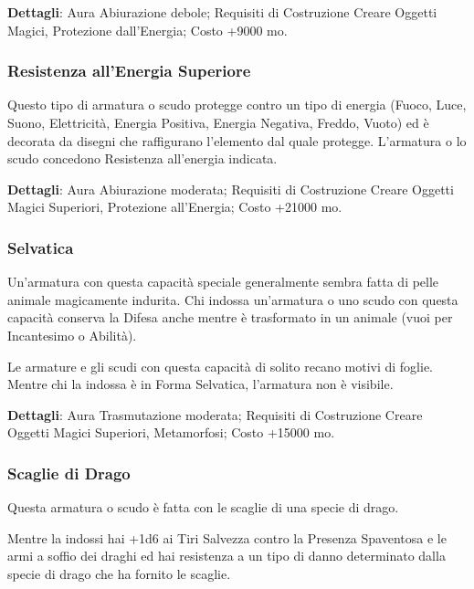\begin{multicols}{2}
\textbf{Dettagli}: Aura Abiurazione debole; Requisiti di Costruzione Creare Oggetti Magici, Protezione dall'Energia; Costo +9000 mo.

\subsubsection*{Resistenza all'Energia Superiore}

Questo tipo di armatura o scudo protegge contro un tipo di energia (Fuoco, Luce, Suono, Elettricità, Energia Positiva, Energia Negativa, Freddo, Vuoto) ed è decorata da disegni che raffigurano l'elemento dal quale protegge. L'armatura o lo scudo concedono Resistenza all'energia indicata.

\textbf{Dettagli}: Aura Abiurazione moderata; Requisiti di Costruzione Creare Oggetti Magici Superiori, Protezione all'Energia; Costo +21000 mo.

\subsubsection*{Selvatica}

Un'armatura con questa capacità speciale generalmente sembra fatta di pelle animale magicamente indurita. Chi indossa un'armatura o uno scudo con questa capacità conserva la Difesa anche mentre è trasformato in un animale (vuoi per Incantesimo o Abilità).

Le armature e gli scudi con questa capacità di solito recano motivi di foglie. Mentre chi la indossa è in Forma Selvatica, l'armatura non è visibile.

\textbf{Dettagli}: Aura Trasmutazione moderata; Requisiti di Costruzione Creare Oggetti Magici Superiori, Metamorfosi; Costo +15000 mo.

\subsubsection*{Scaglie di Drago}

Questa armatura o scudo è fatta con le scaglie di una specie di drago.

Mentre la indossi hai +1d6 ai Tiri Salvezza contro la Presenza Spaventosa e le armi a soffio dei draghi ed hai resistenza a un tipo di danno determinato dalla specie di drago che ha fornito le scaglie.


\end{multicols}
